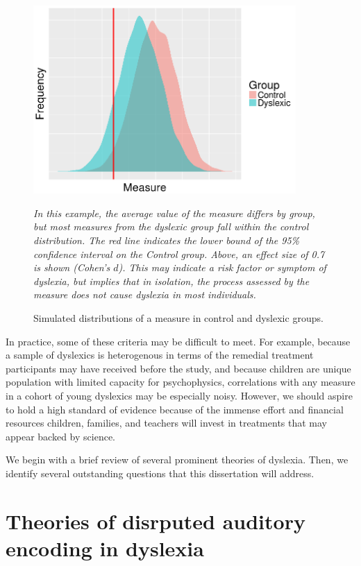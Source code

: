 \documentclass[../uwthesis.tex]{subfiles}
\begin{document}
\begin{figure}
    \centering
    \caption{Simulated distributions of a measure in control and dyslexic groups.}
    \label{fig:intro_fig2.png}
    \includegraphics[width=10cm]{images/intro/intro_fig2.png}
    \item \textit{In this example, the
    average value of the measure differs by group, but most measures from the dyslexic group fall within
    the control distribution. The red line indicates the lower bound of the 95\% confidence interval on the
    Control group. Above, an effect size of 0.7 is shown (Cohen’s $d$). This may indicate a risk factor or
    symptom of dyslexia, but implies that in isolation, the process assessed by the measure does not
    cause dyslexia in most individuals.}
\end{figure}

In practice, some of these criteria may be difficult to meet. For example, because a sample of dyslexics is heterogenous in terms of the remedial treatment participants may have received before the study, and because children are unique population with limited capacity for psychophysics, correlations with any measure in a cohort of young dyslexics may be especially noisy. However, we should aspire to hold a high standard of evidence because of the immense effort and financial resources children, families, and teachers will invest in treatments that may appear backed by science.

We begin with a brief review of several prominent theories of dyslexia. Then, we identify several outstanding questions that this dissertation will address. 

\section{Theories of disrputed auditory encoding in dyslexia}
\end{document}
